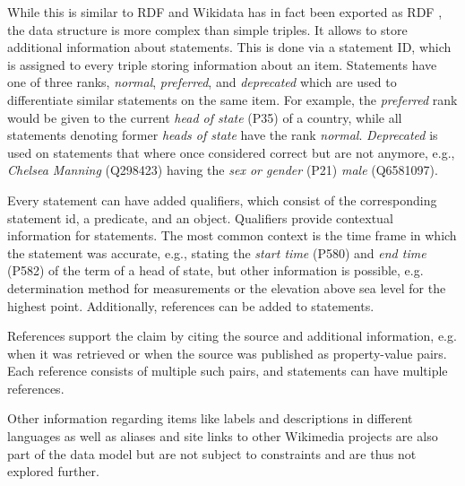 \documentclass[hyperref,bachelorofscience,fleqn]{cgvpub}
\begin{document}
While this is similar to RDF and Wikidata has in fact been exported as RDF \cite{EGKMV2014}, the data structure is more complex than simple triples. It allows to store additional information about statements. This is done via a statement ID, which is assigned to every triple storing information about an item. Statements have one of three ranks, \emph{normal}, \emph{preferred}, and \emph{deprecated} which are used to differentiate similar statements on the same item. For example, the \emph{preferred} rank would be given to the current \emph{head of state} (P35) of a country, while all statements denoting former \emph{heads of state} have the rank \emph{normal}. \emph{Deprecated} is used on statements that where once considered correct but are not anymore, e.g., \emph{Chelsea Manning} (Q298423) having the \emph{sex or gender} (P21) \emph{male} (Q6581097).

Every statement can have added qualifiers, which consist of the corresponding statement id, a predicate, and an object. Qualifiers provide contextual information for statements. The most common context is the time frame in which the statement was accurate, e.g., stating the \emph{start time} (P580) and \emph{end time} (P582) of the term of a head of state, but other information is possible, e.g. determination method for measurements or the elevation above sea level for the highest point. Additionally, references can be added to statements.

References support the claim by citing the source and additional information, e.g. when it was retrieved or when the source was published as property-value pairs. Each reference consists of multiple such pairs, and statements can have multiple references.

Other information regarding items like labels and descriptions in different languages as well as aliases and site links to other Wikimedia projects are also part of the data model but are not subject to constraints and are thus not explored further.
\end{document}
